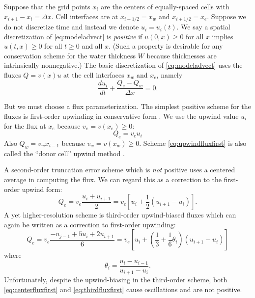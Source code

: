 \documentclass[11pt,final]{amsart}
\begin{document}
Suppose that the grid points $x_i$ are the centers of equally-spaced cells with $x_{i+1}-x_i=\Delta x$.  Cell interfaces are at $x_{i-1/2}=x_w$ and $x_{i+1/2}=x_e$.  Suppose we do not discretize time and instead we denote $u_i=u_i(t)$.  We say a spatial discretization of \eqref{eq:modeladvect} is \emph{positive} if $u(0,x)\ge 0$ for all $x$ implies $u(t,x)\ge 0$ for all $t\ge 0$ and all $x$.  (Such a property is desirable for any conservation scheme for the water thickness $W$ because thicknesses are intrinsically nonnegative.)  The basic discretization of \eqref{eq:modeladvect} uses the fluxes $Q=v(x) u$ at the cell interfaces $x_w$ and $x_e$, namely
\begin{equation}
\frac{du_i}{dt} + \frac{Q_e - Q_w}{\Delta x} = 0. \label{eq:basicmodelFD}
\end{equation}

But we must choose a flux parameterization.  The simplest positive scheme for the fluxes is first-order upwinding in conservative form \citep[section I.4.3]{HundsdorferVerwer2010}.  We use the upwind value $u_i$ for the flux at $x_e$ because $v_e = v(x_e) \ge 0$:
\begin{equation}
Q_e = v_e u_i \label{eq:upwindfluxfirst}
\end{equation}
Also $Q_w = v_w x_{i-1}$ because $v_w = v(x_w) \ge 0$.  Scheme \eqref{eq:upwindfluxfirst} is also called the ``donor cell'' upwind method \citep{LeVeque}.

A second-order truncation error scheme which is \emph{not} positive uses a centered average in computing the flux.  We can regard this as a correction to the first-order upwind form:
\begin{equation}
Q_e = v_e \frac{u_i+u_{i+1}}{2} = v_e \left[u_i + \frac{1}{2} (u_{i+1} - u_i)\right]. \label{eq:centerfluxfirst}
\end{equation}
A yet higher-resolution scheme is third-order upwind-biased fluxes which can again be written as a correction to first-order upwinding:
\begin{equation}
Q_e = v_e \frac{-u_{j-1} + 5 u_i + 2 u_{i+1}}{6} = v_e \left[u_i + \left(\frac{1}{3}+\frac{1}{6} \theta_i \right) (u_{i+1} - u_i)\right] \label{eq:thirdfluxfirst}
\end{equation}
where
\begin{equation}
\theta_i = \frac{u_{i} - u_{i-1}}{u_{i+1} - u_i}.  \label{eq:thetadefine}
\end{equation}
Unfortunately, despite the upwind-biasing in the third-order scheme, both \eqref{eq:centerfluxfirst} and \eqref{eq:thirdfluxfirst} cause oscillations and are not positive.
\end{document}
